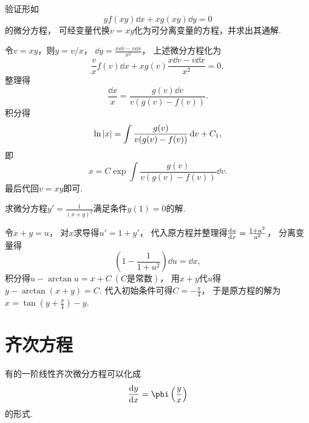 \begin{example}
验证形如\begin{equation*}
	y f(xy) \dd{x} + x g(xy) \dd{y} = 0
\end{equation*}的微分方程，
可经变量代换\(v = xy\)化为可分离变量的方程，并求出其通解.
\begin{solution}
令\(v = xy\)，则\(y = v/x\)，
\(\dd{y} = \frac{x \dd{v} - v \dd{x}}{x^2}\)，
上述微分方程化为\begin{equation*}
	\frac{v}{x} f(v) \dd{x} + x g(v) \frac{x \dd{v} - v \dd{x}}{x^2} = 0,
\end{equation*}
整理得\begin{equation*}
	\frac{\dd{x}}{x}
	= \frac{g(v) \dd{v}}{v (g(v) - f(v))}.
\end{equation*}
积分得\begin{equation*}
	\ln\abs{x}
	= \int \frac{g(v)}{v (g(v) - f(v))} \dd{v} + C_1,
\end{equation*}
即\begin{equation*}
	x = C \exp\int \frac{g(v)}{v (g(v) - f(v))} \dd{v}.
\end{equation*}
最后代回\(v = xy\)即可.
\end{solution}
\end{example}

\begin{example}
求微分方程\(y'=\frac1{(x+y)^2}\)满足条件\(y(1)=0\)的解.
\begin{solution}
令\(x+y=u\)，
对\(x\)求导得\(u'=1+y'\)，
代入原方程并整理得\(\dv{u}{x}=\frac{1+u^2}{u^2}\)，
分离变量得\begin{equation*}
	\left( 1-\frac1{1+u^2} \right) \dd{u}
	= \dd{x},
\end{equation*}
积分得\(u-\arctan u=x+C\ (\text{$C$是常数})\)，
用\(x+y\)代\(u\)得\(y-\arctan(x+y)=C\).
代入初始条件可得\(C=-\frac\pi4\)，
于是原方程的解为\(x=\tan\left(y+\frac\pi4\right)-y\).
\end{solution}
\end{example}

\section{齐次方程}
有的一阶线性齐次微分方程可以化成\begin{equation}\label{equation:微分方程.一阶齐次方程}
	\dv{y}{x}=\phi\left(\frac{y}{x}\right)
\end{equation}的形式.

